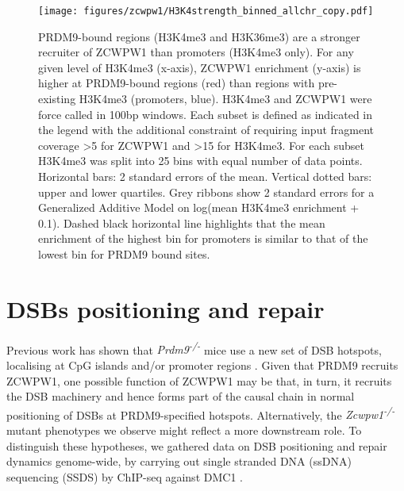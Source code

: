 \begin{figure}[H]
	\centering
	\texttt{[image: figures/zcwpw1/H3K4strength\_binned\_allchr\_copy.pdf]}
	\caption[Dual mark recruitment]{
		PRDM9-bound regions (H3K4me3 and H3K36me3) are a stronger recruiter of ZCWPW1 than promoters (H3K4me3 only).
		For any given level of H3K4me3 (x-axis), ZCWPW1 enrichment (y-axis) is higher at PRDM9-bound regions (red) than regions with pre-existing H3K4me3 (promoters, blue).
		H3K4me3 and ZCWPW1 were force called in 100bp windows.
		Each subset is defined as indicated in the legend with the additional constraint of requiring input fragment coverage >5 for ZCWPW1 and >15 for H3K4me3.
		For each subset H3K4me3 was split into 25 bins with equal number of data points.
		Horizontal bars: 2 standard errors of the mean.
		Vertical dotted bars: upper and lower quartiles.
		Grey ribbons show 2 standard errors for a Generalized Additive Model on log(mean H3K4me3 enrichment + 0.1).
		Dashed black horizontal line highlights that the mean enrichment of the highest bin for promoters is similar to that of the lowest bin for PRDM9 bound sites.
	}
	\label{fig:DualMark}
\end{figure}

\section{DSBs positioning and repair}
Previous work has shown that \textit{Prdm9\textsuperscript{-/-}} mice use a new set of DSB hotspots, localising at CpG islands and/or promoter regions \parencite{Brick2012Genetic}.
Given that PRDM9 recruits ZCWPW1, one possible function of ZCWPW1 may be that, in turn, it recruits the DSB machinery and hence forms part of the causal chain in normal positioning of DSBs at PRDM9-specified hotspots.
Alternatively, the \textit{Zcwpw1\textsuperscript{-/-}} mutant phenotypes we observe might reflect a more downstream role.
To distinguish these hypotheses, we gathered data on DSB positioning and repair dynamics genome-wide, by carrying out single stranded DNA (ssDNA) sequencing (SSDS) by ChIP-seq against DMC1 \parencite{Khil2012Sensitive}.

